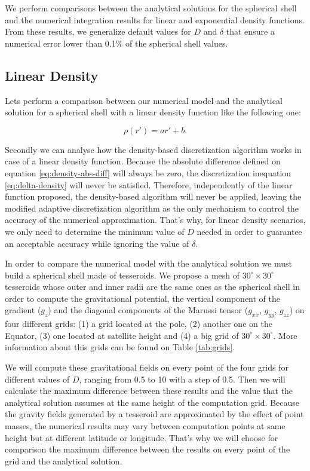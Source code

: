 \documentclass[extra]{gji}
\begin{document}
We perform comparisons between the analytical solutions for the spherical shell  and the
numerical integration results for linear and exponential density functions.
From these results, we generalize default values for $D$ and $\delta$ that ensure a
numerical error lower than 0.1\% of the spherical shell values.


\subsection{Linear Density}

Lets perform a comparison between our numerical model and the
analytical solution for a spherical shell with a linear density
function like the following one:

\begin{equation}
    \rho(r') = ar' + b.
\end{equation}

Secondly we can analyse how the density-based discretization algorithm
works in case of a linear density function.
Because the absolute difference defined on equation
\ref{eq:density-abs-diff} will always be zero, the discretization
inequation \ref{eq:delta-density} will never be satisfied.
Therefore, independently of the linear function proposed, the
density-based algorithm will never be applied, leaving the modified
adaptive discretization algorithm as the only mechanism to control the
accuracy of the numerical approximation.
That's why, for linear density scenarios, we only need to determine
the minimum value of $D$ needed in order to guarantee an acceptable
accuracy while ignoring the value of $\delta$.

In order to compare the numerical model with the analytical solution we
must build a spherical shell made of tesseroids.
We propose a mesh of $30^\circ \times 30^\circ$ tesseroids whose outer and
inner radii are the same ones as the spherical shell in order to compute
the gravitational potential, the vertical component of the gradient
($g_z$) and the diagonal components of the Marussi tensor ($g_{xx}$,
$g_{yy}$, $g_{zz}$) on four different grids: (1) a grid located at the
pole, (2) another one on the Equator, (3) one located at satellite
height and (4) a big grid of $30^\circ \times 30^\circ$.
More information about this grids can be found on Table
\ref{tab:grids}.

We will compute these gravitational fields on every point of the four
grids for different values of $D$, ranging from 0.5 to 10 with a step
of 0.5.
Then we will calculate the maximum difference between these results and the
value that the analytical solution assumes at the same height of the
computation grid.
Because the gravity fields generated by a tesseroid are approximated by
the effect of point masses, the numerical results may vary between
computation points at same height but at different latitude or
longitude.
That's why we will choose for comparison the maximum difference between the
results on every point of the grid and the analytical solution.
\end{document}

